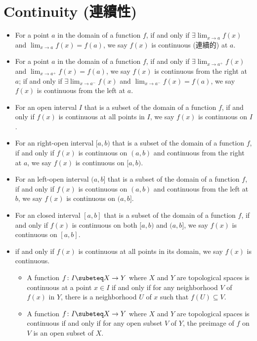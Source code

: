 \documentclass[a4paper,12pt]{report}
\begin{document}
\section{Continuity (連續性)}
\begin{itemize}
\item For a point $a$ in the domain of a function $f$, if and only if $\exists\lim_{x\to a}f(x)$ and $\lim_{x\to a}f(x)=f(a)$, we say $f(x)$ is continuous (連續的) at $a$.
\item For a point $a$ in the domain of a function $f$, if and only if $\exists\lim_{x\to a^+}f(x)$ and $\lim_{x\to a^+}f(x)=f(a)$, we say $f(x)$ is continuous from the right at $a$; if and only if $\exists \lim_{x\to a^-} f(x)$ and $\lim_{x\to a^-} f(x)=f(a)$, we say $f(x)$ is continuous from the left at $a$.
\item For an open interval $I$ that is a subset of the domain of a function $f$, if and only if $f(x)$ is continuous at all points in $I$, we say $f(x)$ is continuous on $I$.
\item For an right-open interval $[a,b)$ that is a subset of the domain of a function $f$, if and only if $f(x)$ is continuous on $(a,b)$ and continuous from the right at $a$, we say $f(x)$ is continuous on $[a,b)$.
\item For an left-open interval $(a,b]$ that is a subset of the domain of a function $f$, if and only if $f(x)$ is continuous on $(a,b)$ and continuous from the left at $b$, we say $f(x)$ is continuous on $(a,b]$.
\item For an closed interval $[a,b]$ that is a subset of the domain of a function $f$, if and only if $f(x)$ is continuous on both $[a,b)$ and $(a,b]$, we say $f(x)$ is continuous on $[a,b]$.
\item if and only if $f(x)$ is continuous at all points in its domain, we say $f(x)$ is continuous.
\eit
{}
\begin{itemize}
\item A function $f\colon I\subeteq X\to Y$ where $X$ and $Y$ are topological spaces is continuous at a point $x\in I$ if and only if for any neighborhood $V$ of $f(x)$ in $Y$, there is a neighborhood $U$ of $x$ such that $f(U)\subseteq V$.
\item A function $f\colon I\subeteq X\to Y$ where $X$ and $Y$ are topological spaces is continuous if and only if for any open subset $V$ of $Y$, the preimage of $f$ on $V$ is an open subset of $X$.

\end{itemize}
\end{itemize}
\end{document}
